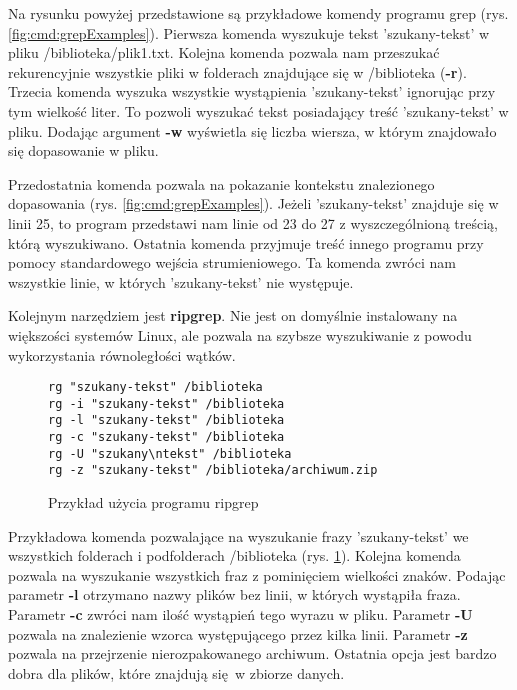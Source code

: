 Na rysunku powyżej przedstawione są przykładowe komendy programu grep 
(rys. \ref{fig:cmd:grepExamples}). Pierwsza komenda wyszukuje tekst 'szukany-tekst' w pliku /biblioteka/plik1.txt.
Kolejna komenda pozwala nam przeszukać rekurencyjnie wszystkie pliki w folderach znajdujące się w 
/biblioteka (\textbf{-r}). Trzecia komenda wyszuka wszystkie wystąpienia 
'szukany-tekst' ignorując przy tym wielkość liter. To pozwoli wyszukać tekst
posiadający treść 'szukany-tekst' w pliku. Dodając argument \textbf{-w}
wyświetla się liczba wiersza, w którym znajdowało się dopasowanie w pliku. 

Przedostatnia komenda pozwala na pokazanie kontekstu znalezionego dopasowania 
(rys. \ref{fig:cmd:grepExamples}). Jeżeli 'szukany-tekst' znajduje się w linii 25, to
program przedstawi nam linie od 23 do 27 z wyszczególnioną treścią, którą 
wyszukiwano. Ostatnia komenda przyjmuje treść innego programu przy pomocy
standardowego wejścia strumieniowego. Ta komenda zwróci nam wszystkie linie,
w których 'szukany-tekst' nie występuje.

Kolejnym narzędziem jest \textbf{ripgrep}. Nie jest on domyślnie instalowany na 
większości systemów Linux, ale pozwala na szybsze wyszukiwanie z powodu
wykorzystania równoległości wątków.

\begin{figure}[h]
  \centering
\begin{tcolorbox}[
    colback=white,
    colframe=black,
    boxrule=0.5pt,
    arc=0pt
]
  \begin{verbatim}
rg "szukany-tekst" /biblioteka
rg -i "szukany-tekst" /biblioteka
rg -l "szukany-tekst" /biblioteka
rg -c "szukany-tekst" /biblioteka
rg -U "szukany\ntekst" /biblioteka
rg -z "szukany-tekst" /biblioteka/archiwum.zip
  \end{verbatim}
\end{tcolorbox}
\caption{Przykład użycia programu ripgrep}
\label{fig:cmd:ripgrepExamples}
\end{figure}

Przykładowa komenda pozwalające na wyszukanie frazy 'szukany-tekst' we wszystkich
folderach i podfolderach /biblioteka (rys. \ref{fig:cmd:ripgrepExamples}). Kolejna
komenda pozwala na wyszukanie wszystkich fraz z pominięciem wielkości znaków. 
Podając parametr \textbf{-l} otrzymano nazwy plików bez linii, w których 
wystąpiła fraza. Parametr \textbf{-c} zwróci nam ilość wystąpień tego wyrazu w 
pliku. Parametr \textbf{-U} pozwala na znalezienie wzorca występującego przez 
kilka linii. Parametr \textbf{-z} pozwala na przejrzenie nierozpakowanego 
archiwum. Ostatnia opcja jest bardzo dobra dla plików, które znajdują się w 
zbiorze danych.

